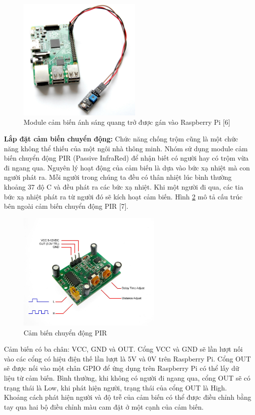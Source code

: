 \documentclass[12pt,a4paper,oneside]{extbook}
\begin{document}
\begin{figure}[h]
  \centering
     \includegraphics[width=6cm]{6-light-sensor}
  \caption{Module cảm biến ánh sáng quang trở được gán vào Raspberry Pi [6]}\label{fig:6-light-sensor}
\end{figure}

\textbf{Lắp đặt cảm biến chuyển động:} Chức năng chống trộm cũng là một chức năng không thể thiếu của một ngôi nhà thông minh. Nhóm sử dụng module cảm biến chuyển động PIR (Passive InfraRed) để nhận biết có người hay có trộm vừa đi ngang qua. Nguyên lý hoạt động của cảm biến là dựa vào bức xạ nhiệt mà con người phát ra. Mỗi người trong chúng ta đều có thân nhiệt lúc bình thường khoảng 37 độ C và đều phát ra các bức xạ nhiệt. Khi một người đi qua, các tia bức xạ nhiệt phát ra từ người đó sẽ kích hoạt cảm biến. Hình \ref{fig:6-pir-sensor} mô tả cấu trúc bên ngoài cảm biến chuyển động PIR [7].

\begin{figure}[h]
  \centering
     \includegraphics[width=7cm]{6-pir-sensor}
  \caption{Cảm biến chuyển động PIR}\label{fig:6-pir-sensor}
\end{figure}

Cảm biến có ba chân: VCC, GND và OUT. Cổng VCC và GND sẽ lần lượt nối vào các cổng có hiệu điện thế lần lượt là 5V và 0V trên Raspberry Pi. Cổng OUT sẽ được nối vào một chân GPIO để ứng dụng trên Raspberry Pi có thể lấy dữ liệu từ cảm biến. Bình thường, khi không có người đi ngang qua, cổng OUT sẽ có trạng thái là Low, khi phát hiện người, trạng thái của cổng OUT là High. Khoảng cách phát hiện người và độ trễ của cảm biến có thể được điều chỉnh bằng tay qua hai bộ điều chỉnh màu cam đặt ở một cạnh của cảm biến.
\end{document}
